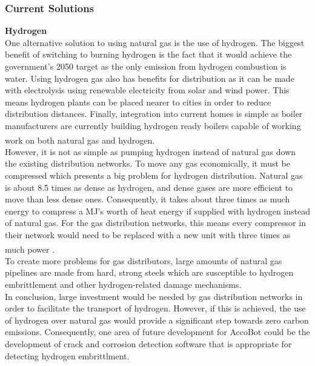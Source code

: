 \documentclass[11pt]{article}		%
\newcommand{\supercite}[1]{\textsuperscript{\cite{#1}}}		%
\begin{document}
            \subsubsection[Current Solutions]{Current Solutions}
            
            \textbf{Hydrogen} \\
            One alternative solution to using natural gas is the use of hydrogen. The biggest benefit of switching to burning hydrogen is the fact that it would achieve the government's 2050 target as the only emission from hydrogen combustion is water. Using hydrogen gas also has benefits for distribution as it can be made with electrolysis using renewable electricity from solar and wind power. This means hydrogen plants can be placed nearer to cities in order to reduce distribution distances. Finally, integration into current homes is simple as boiler manufacturers are currently building hydrogen ready boilers capable of working work on both natural gas and hydrogen\supercite{boilers}.
            \\
            \hspace*{3ex}However, it is not as simple as pumping hydrogen instead of natural gas down the existing distribution networks. To move any gas economically, it must be compressed which presents a big problem for hydrogen distribution. Natural gas is about 8.5 times as dense as hydrogen, and dense gases are more efficient to move than less dense ones. Consequently, it takes about three times as much energy to compress a MJ’s worth of heat energy if supplied with hydrogen instead of natural gas. For the gas distribution networks, this means every compressor in their network would need to be replaced with a new unit with three times as much power \supercite{hydrogendense}.
            \\
            \hspace*{3ex}To create more problems for gas distributors, large amounts of natural gas pipelines are made from hard, strong steels which are susceptible to hydrogen embrittlement and other hydrogen-related damage mechanisms.
            \\
            \hspace*{3ex}In conclusion, large investment would be needed by gas distribution networks in order to facilitate the transport of hydrogen. However, if this is achieved, the use of hydrogen over natural gas would provide a significant step towards zero carbon emissions. Consequently, one area of future development for AccoBot could be the development of crack and corrosion detection software that is appropriate for detecting hydrogen embrittlment. 
            
\end{document}
